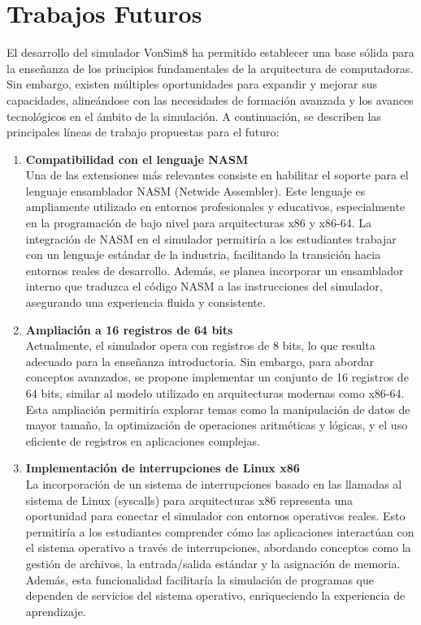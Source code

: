 \documentclass[12pt,oneside]{templates/unerthesis}
\begin{document}
\hypertarget{futuro}{%
\chapter{Trabajos Futuros}\label{futuro}}

El desarrollo del simulador VonSim8 ha permitido establecer una base sólida para la enseñanza de los principios fundamentales de la arquitectura de computadoras. Sin embargo, existen múltiples oportunidades para expandir y mejorar sus capacidades, alineándose con las necesidades de formación avanzada y los avances tecnológicos en el ámbito de la simulación. A continuación, se describen las principales líneas de trabajo propuestas para el futuro:

\begin{enumerate}
\def\labelenumi{\arabic{enumi}.}
\item
  \textbf{Compatibilidad con el lenguaje NASM}\\
  Una de las extensiones más relevantes consiste en habilitar el soporte para el lenguaje ensamblador NASM (Netwide Assembler). Este lenguaje es ampliamente utilizado en entornos profesionales y educativos, especialmente en la programación de bajo nivel para arquitecturas x86 y x86-64. La integración de NASM en el simulador permitiría a los estudiantes trabajar con un lenguaje estándar de la industria, facilitando la transición hacia entornos reales de desarrollo. Además, se planea incorporar un ensamblador interno que traduzca el código NASM a las instrucciones del simulador, asegurando una experiencia fluida y consistente.
\item
  \textbf{Ampliación a 16 registros de 64 bits}\\
  Actualmente, el simulador opera con registros de 8 bits, lo que resulta adecuado para la enseñanza introductoria. Sin embargo, para abordar conceptos avanzados, se propone implementar un conjunto de 16 registros de 64 bits, similar al modelo utilizado en arquitecturas modernas como x86-64. Esta ampliación permitiría explorar temas como la manipulación de datos de mayor tamaño, la optimización de operaciones aritméticas y lógicas, y el uso eficiente de registros en aplicaciones complejas.
\item
  \textbf{Implementación de interrupciones de Linux x86}\\
  La incorporación de un sistema de interrupciones basado en las llamadas al sistema de Linux (syscalls) para arquitecturas x86 representa una oportunidad para conectar el simulador con entornos operativos reales. Esto permitiría a los estudiantes comprender cómo las aplicaciones interactúan con el sistema operativo a través de interrupciones, abordando conceptos como la gestión de archivos, la entrada/salida estándar y la asignación de memoria. Además, esta funcionalidad facilitaría la simulación de programas que dependen de servicios del sistema operativo, enriqueciendo la experiencia de aprendizaje.

\end{enumerate}
\end{document}
